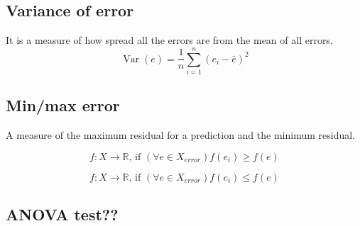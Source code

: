 \documentclass[
  letterpaper,
  DIV=11,
  numbers=noendperiod]{scrreprt}
\begin{document}
\hypertarget{variance-of-error}{%
\subsection{Variance of error}\label{variance-of-error}}

It is a measure of how spread all the errors are from the mean of all
errors. \[
\operatorname{Var}(e)=\frac{1}{n}\sum_{i=1}^n(e_i-\bar{e})^2
\]

\hypertarget{minmax-error}{%
\subsection{Min/max error}\label{minmax-error}}

A measure of the maximum residual for a prediction and the minimum
residual.

\[
f: X \rightarrow \mathbb{R} \text {, if }(\forall e \in X_{error}) f\left(e_i\right) \geq f(e)
\]

\[
f: X \rightarrow \mathbb{R} \text {, if }(\forall e \in X_{error}) f\left(e_i\right) \leq f(e)
\]

\hypertarget{anova-test}{%
\subsection{ANOVA test??}\label{anova-test}}
\end{document}
